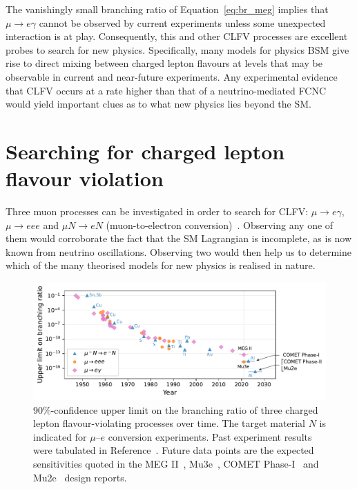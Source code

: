 The vanishingly small branching ratio of Equation~\ref{eq:br_meg} implies that
$\mu\rightarrow e\gamma$ cannot be observed by current experiments unless some
unexpected interaction is at play. Consequently, this and other CLFV processes
are excellent probes to search for new physics. Specifically, many models for
physics BSM give rise to direct mixing between charged lepton flavours at levels
that may be observable in current and near-future experiments. Any experimental
evidence that CLFV occurs at a rate higher than that of a neutrino-mediated FCNC
would yield important clues as to what new physics lies beyond the SM.

\section{Searching for charged lepton flavour violation}\label{sec:clfv}

Three muon processes can be investigated in order to search for CLFV: ${\mu
\rightarrow e\gamma}$, ${\mu \rightarrow eee}$ and ${\mu N \rightarrow e N}$
(muon-to-electron conversion)~\cite{BERNSTEIN201327}. Observing any one of them
would corroborate the fact that the SM Lagrangian is incomplete, as is now known
from neutrino oscillations. Observing two would then help us to determine which
of the many theorised models for new physics is realised in nature. 


\begin{figure}
    \centering
    \includegraphics[width=\textwidth]{chapter1/clfv_upper_limit_v2.pdf}
    \caption{
        90\%-confidence upper limit on the branching ratio of three charged
        lepton flavour-violating processes over time. 
        The target material $N$ is indicated for $\mu$--$e$ conversion experiments.
        Past experiment results
        were tabulated in Reference~\cite{BERNSTEIN201327}. Future data points are the
        expected sensitivities quoted in the MEG II~\cite{Baldini2018},
        Mu3e~\cite{ARNDT2021165679}, COMET
        Phase-I~\cite{the_comet_collaboration_comet_2020} and
        Mu2e~\cite{bartoszek2015mu2e} design reports.
    }
    \label{fig:clfv_upper_limit}
\end{figure}

